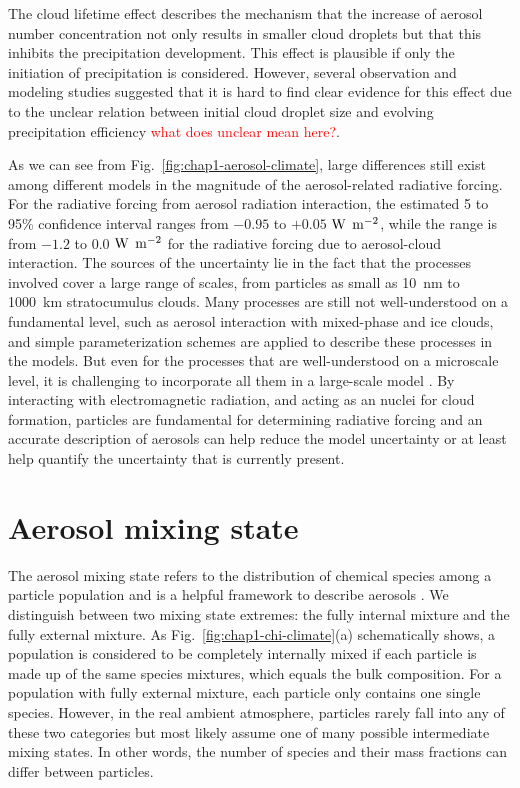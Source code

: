 \documentclass[edeposit,fullpage]{uiucthesis2009}
\begin{document}
The cloud lifetime effect describes the mechanism that the increase of
aerosol number concentration not only results in smaller cloud
droplets but that this inhibits the precipitation development. This
effect is plausible if only the initiation of precipitation is
considered. However, several observation and modeling studies
suggested that it is hard to find clear evidence for this effect due
to the unclear relation between initial cloud droplet size and
evolving precipitation efficiency \citep{stevens2009untangling}
\textcolor{red}{what does unclear mean here?}.

As we can see from Fig.~\ref{fig:chap1-aerosol-climate}, large
differences still exist among different models in the magnitude of the
aerosol-related radiative forcing. For the radiative forcing from
aerosol radiation interaction, the estimated 5 to 95\% confidence
interval ranges from $-0.95$ to $+ 0.05$ $\rm W$ $\rm m^{-2}$, while
the range is from $-1.2$ to $0.0$ $\rm W$ $\rm m^{-2}$ for the
radiative forcing due to aerosol-cloud interaction. The sources of the
uncertainty lie in the fact that the processes involved cover a large
range of scales, from particles as small as 10~nm to 1000~km
stratocumulus clouds. Many processes are still not well-understood on
a fundamental level, such as aerosol interaction with mixed-phase and
ice clouds, and simple parameterization schemes are applied to
describe these processes in the models. But even for the processes
that are well-understood on a microscale level, it is challenging to
incorporate all them in a large-scale model
\citep{seinfeld2016improving,bellouin2020bounding}. By interacting
with electromagnetic radiation, and acting as an nuclei for cloud
formation, particles are fundamental for determining radiative forcing
and an accurate description of aerosols can help reduce the model
uncertainty or at least help quantify the uncertainty that is
currently present.

\section{Aerosol mixing state}
The aerosol mixing state refers to the distribution of chemical
species among a particle population and is a helpful framework to
describe aerosols \citep{winkler1973growth}. We distinguish between
two mixing state extremes: the fully internal mixture and the fully
external mixture. As Fig.~\ref{fig:chap1-chi-climate}(a) schematically
shows, a population is considered to be completely internally mixed if
each particle is made up of the same species mixtures, which equals
the bulk composition. For a population with fully external mixture,
each particle only contains one single species. However, in the real
ambient atmosphere, particles rarely fall into any of these two
categories but most likely assume one of many possible intermediate
mixing states. In other words, the number of species and their mass
fractions can differ between particles.
\end{document}

